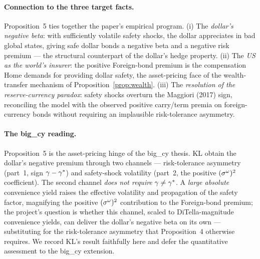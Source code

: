 \paragraph{Connection to the three target facts.} Proposition~5 ties together the
paper's empirical program. (i) The \emph{dollar's negative beta}: with sufficiently
volatile safety shocks, the dollar appreciates in bad global states, giving safe
dollar bonds a negative beta and a negative risk premium --- the structural
counterpart of the dollar's hedge property. (ii) The \emph{US as the world's
insurer}: the positive Foreign-bond premium is the compensation Home demands for
providing dollar safety, the asset-pricing face of the wealth-transfer mechanism
of Proposition~\ref{prop:wealth}. (iii) The \emph{resolution of the
reserve-currency paradox}: safety shocks overturn the Maggiori (2017) sign,
reconciling the model with the observed positive carry/term premia on
foreign-currency bonds without requiring an implausible risk-tolerance asymmetry.

\paragraph{The big\_cy reading.} Proposition~5 is the asset-pricing hinge of the
big\_cy thesis. KL obtain the dollar's negative premium through two channels ---
risk-tolerance asymmetry (part~1, sign $\gamma-\gamma^{*}$) and safety-shock volatility
(part~2, the positive $(\sigma^{\omega})^2$ coefficient). The second channel
\emph{does not require} $\gamma\neq\gamma^{*}$. A \emph{large absolute} convenience yield
raises the effective volatility and propagation of the safety factor, magnifying
the positive $(\sigma^{\omega})^2$ contribution to the Foreign-bond premium; the
project's question is whether this channel, scaled to DiTella-magnitude
convenience yields, can deliver the dollar's negative beta on its own ---
substituting for the risk-tolerance asymmetry that Proposition~4 otherwise
requires. We record KL's result faithfully here and defer the quantitative
assessment to the big\_cy extension.
